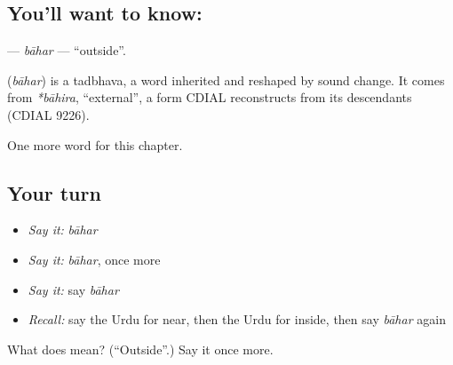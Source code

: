 \subsection*{You'll want to know: }
\textbf{} — \emph{bāhar} — \textquotedblleft{}outside\textquotedblright{}.

\begin{cousinweb}
\textbf{} (\emph{bāhar}) is a tadbhava, a word inherited and reshaped by sound change. It comes from \emph{*bāhira}, \textquotedblleft{}external\textquotedblright{}, a form CDIAL reconstructs from its descendants (CDIAL 9226).
\end{cousinweb}

\begin{grammarlens}[title={What you've built}]
One more word for this chapter.
\end{grammarlens}

\subsection*{Your turn}
\begin{itemize}
\raggedright
  \item \emph{Say it:} \emph{bāhar}
  \item \emph{Say it:} \emph{bāhar}, once more
  \item \emph{Say it:} say \emph{bāhar}
  \item \emph{Recall:} say the Urdu for near, then the Urdu for inside, then say \emph{bāhar} again
\end{itemize}

\begin{tcolorbox}[breakable,colback=teal!4,colframe=teal!35!black,title={Before you move on}]
What does  mean? (\textquotedblleft{}Outside\textquotedblright{}.) Say it once more.
\end{tcolorbox}
